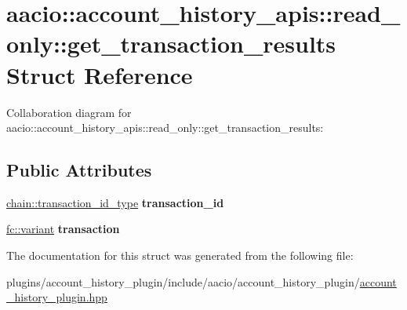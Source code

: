 \hypertarget{structaacio_1_1account__history__apis_1_1read__only_1_1get__transaction__results}{}\section{aacio\+:\+:account\+\_\+history\+\_\+apis\+:\+:read\+\_\+only\+:\+:get\+\_\+transaction\+\_\+results Struct Reference}
\label{structaacio_1_1account__history__apis_1_1read__only_1_1get__transaction__results}


Collaboration diagram for aacio\+:\+:account\+\_\+history\+\_\+apis\+:\+:read\+\_\+only\+:\+:get\+\_\+transaction\+\_\+results\+:
\subsection*{Public Attributes}
\begin{DoxyCompactItemize}
\item 
\mbox{\label{structaacio_1_1account__history__apis_1_1read__only_1_1get__transaction__results_aeb2afb4295dd1d3c999db12c697cc96a}} 
\mbox{\hyperlink{classfc_1_1sha256}{chain\+::transaction\+\_\+id\+\_\+type}} {\bfseries transaction\+\_\+id}
\item 
\mbox{\label{structaacio_1_1account__history__apis_1_1read__only_1_1get__transaction__results_aa95b159db152ffeb93dc5b8deb19ab1b}} 
\mbox{\hyperlink{classfc_1_1variant}{fc\+::variant}} {\bfseries transaction}
\end{DoxyCompactItemize}


The documentation for this struct was generated from the following file\+:\begin{DoxyCompactItemize}
\item 
plugins/account\+\_\+history\+\_\+plugin/include/aacio/account\+\_\+history\+\_\+plugin/\mbox{\hyperlink{account__history__plugin_8hpp}{account\+\_\+history\+\_\+plugin.\+hpp}}\end{DoxyCompactItemize}
